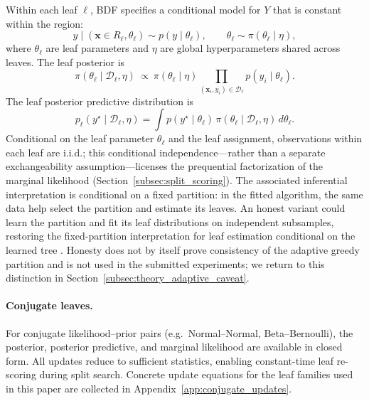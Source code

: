 \documentclass[10pt]{article} %
\begin{document}
Within each leaf $\ell$, BDF specifies a conditional model for $Y$ that is constant within the region:
\[
y \mid (\mathbf{x}\in R_\ell, \theta_\ell) \sim p(y \mid \theta_\ell),
\qquad
\theta_\ell \sim \pi(\theta_\ell \mid \eta),
\]
where $\theta_\ell$ are leaf parameters and $\eta$ are global hyperparameters shared across leaves.
The leaf posterior is
\[
\pi(\theta_\ell \mid \mathcal{D}_\ell, \eta)
\ \propto\
\pi(\theta_\ell \mid \eta)\prod_{(\mathbf{x}_i,y_i)\in\mathcal{D}_\ell} p(y_i\mid\theta_\ell).
\]
The leaf posterior predictive distribution is
\begin{equation}\label{eq:leaf_ppd}
p_\ell(y^\star \mid \mathcal{D}_\ell, \eta)
=
\int p(y^\star \mid \theta_\ell)\,\pi(\theta_\ell \mid \mathcal{D}_\ell,\eta)\,d\theta_\ell.
\end{equation}
Conditional on the leaf parameter $\theta_\ell$ and the leaf assignment, observations within each leaf are i.i.d.; this conditional independence---rather than a separate exchangeability assumption---licenses the prequential factorization of the marginal likelihood (Section~\ref{subsec:split_scoring}). The associated inferential interpretation is conditional on a fixed partition: in the fitted algorithm, the same data help select the partition and estimate its leaves. An honest variant could learn the partition and fit its leaf distributions on independent subsamples, restoring the fixed-partition interpretation for leaf estimation conditional on the learned tree \citep{athey2019generalized}. Honesty does not by itself prove consistency of the adaptive greedy partition and is not used in the submitted experiments; we return to this distinction in Section~\ref{subsec:theory_adaptive_caveat}.

\paragraph{Conjugate leaves.}
For conjugate likelihood--prior pairs (e.g.\ Normal--Normal, Beta--Bernoulli), the posterior, posterior predictive, and marginal likelihood are available in closed form. All updates reduce to sufficient statistics, enabling constant-time leaf re-scoring during split search. Concrete update equations for the leaf families used in this paper are collected in Appendix~\ref{app:conjugate_updates}.
\end{document}
